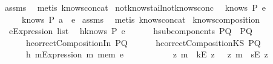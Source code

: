 \begin{isabellebody}
\ assms\ \isamarkupfalse%
\ {\isacharparenleft}metis\ knows{\isacharunderscore}concat{\isacharunderscore}{}{\isacharparenright}%
\endisatagproof
{\isafoldproof}%
%
\isadelimproof
\isanewline
%
\endisadelimproof
\isanewline
{}\isamarkupfalse%
\ not{\isacharunderscore}knows{\isacharunderscore}tail{\isacharunderscore}not{\isacharunderscore}knows{\isacharunderscore}conc{\isacharcolon}\isanewline
{}\ {\isachardoublequoteopen}{\isasymnot}\ knows\ P\ e{\isachardoublequoteclose}\isanewline
{}\ \ \ \ {\isachardoublequoteopen}{\isasymnot}\ knows\ P\ {\isacharparenleft}a\ {\isacharhash}\ e{\isacharparenright}{\isachardoublequoteclose}\isanewline
%
\isadelimproof
%
\endisadelimproof
%
\isatagproof
{}\isamarkupfalse%
\ assms\ \isamarkupfalse%
\ {\isacharparenleft}metis\ knows{\isacharunderscore}concat{\isacharunderscore}{}{\isacharparenright}%
\endisatagproof
{\isafoldproof}%
%
\isadelimproof
\isanewline
%
\endisadelimproof
\isanewline
{}\isamarkupfalse%
\ knows{\isacharunderscore}composition{}{\isacharcolon}\isanewline
\ \ e{\isacharcolon}{\isacharcolon}{\isachardoublequoteopen}Expression\ list{\isachardoublequoteclose}\isanewline
\ \ h{}{\isacharcolon}{\isachardoublequoteopen}knows\ P\ e{\isachardoublequoteclose}\isanewline
\ \ \ \ \ \ h{}{\isacharcolon}{\isachardoublequoteopen}subcomponents\ PQ\ {\isacharequal}\ {\isacharbraceleft}P{\isacharcomma}Q{\isacharbraceright}{\isachardoublequoteclose}\isanewline
\ \ \ \ \ \ h{}{\isacharcolon}{\isachardoublequoteopen}correctCompositionIn\ PQ{\isachardoublequoteclose}\isanewline
\ \ \ \ \ \ h{}{\isacharcolon}{\isachardoublequoteopen}correctCompositionKS\ PQ{\isachardoublequoteclose}\isanewline
\ \ \ \ \ \ h{}{\isacharcolon}{\isachardoublequoteopen}{\isasymforall}\ {\isacharparenleft}m{\isacharcolon}{\isacharcolon}Expression{\isacharparenright}{\isachardot}\ {\isacharparenleft}{\isacharparenleft}m\ mem\ e{\isacharparenright}\ {\isasymlongrightarrow}\ \isanewline
\ \ \ \ \ \ \ \ {\isacharparenleft}{\isacharparenleft}{\isasymexists}\ z{}{\isachardot}\ m\ {\isacharequal}\ {\isacharparenleft}kE\ z{}{\isacharparenright}{\isacharparenright}\ {\isasymor}\ {\isacharparenleft}{\isasymexists}\ z{}{\isachardot}\ m\ {\isacharequal}\ {\isacharparenleft}sE\ z{}{\isacharparenright}{\isacharparenright}{\isacharparenright}{\isacharparenright}{\isachardoublequoteclose}\isanewline

\end{isabellebody}
